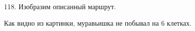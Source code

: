 118. Изобразим описанный маршрут.
\begin{center}
\begin{figure}[ht!]
\end{figure}
\end{center}
Как видно из картинки, муравьишка не побывал на 6 клетках.\\
